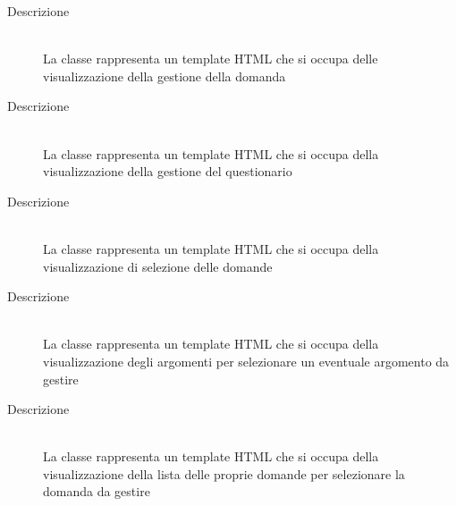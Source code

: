 \begin{description}
\item[Descrizione] \hfill \\
La classe rappresenta un template HTML che si occupa delle visualizzazione della gestione della domanda
\end{description}

\vspace{0.5cm}
\hypertarget{client::view::teacher::ManipulateQuestionnaire}{}
\begin{description}
\item[Descrizione] \hfill \\
La classe rappresenta un template HTML che si occupa della visualizzazione della gestione del questionario 
\end{description}

\vspace{0.5cm}
\hypertarget{client::view::teacher::SelectQuestion}{}
\begin{description}
\item[Descrizione] \hfill \\
La classe rappresenta un template HTML che si occupa della visualizzazione di selezione delle domande
\end{description}

\vspace{0.5cm}
\hypertarget{client::view::teacher::ManageTags}{}
\begin{description}
\item[Descrizione] \hfill \\
La classe rappresenta un template HTML che si occupa della visualizzazione degli argomenti per selezionare un eventuale argomento da gestire
\end{description}

\vspace{0.5cm}
\hypertarget{client::view::teacher::ManageQuestions}{}
\begin{description}
\item[Descrizione] \hfill \\
La classe rappresenta un template HTML che si occupa della visualizzazione della lista delle proprie domande per selezionare la domanda da gestire
\end{description}

